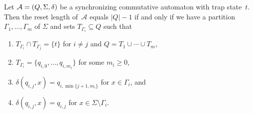 \begin{theorem}
	Let $\mathcal A = (Q, \Sigma, \delta)$ be a synchronizing commutative automaton
	with trap state~$t$.
	Then the reset length of~$\mathcal A$ equals $|Q| - 1$ if and only if 
	we have a partition $\Gamma_1, \ldots, \Gamma_m$ of $\Sigma$
	and sets $T_{\Gamma_i} \subseteq Q$ such that
	\begin{enumerate}
	\item $T_{\Gamma_i} \cap T_{\Gamma_j} = \{t\}$ for $i \ne j$ and $Q = T_1 \cup \cdots \cup T_m$,
	
	\item $T_{\Gamma_i} = \{ q_{i,0}, \ldots, q_{i, m_i}\}$ for some $m_i \ge 0$, %
	
	\item $\delta(q_{i,j}, x) = q_{i, \min\{j+1,m_i\}}$	for $x \in \Gamma_i$, and
	
	\item $\delta(q_{i,j}, x) = q_{i,j}$ for $x \in \Sigma \setminus \Gamma_i$.	
\end{enumerate}
\end{theorem}
